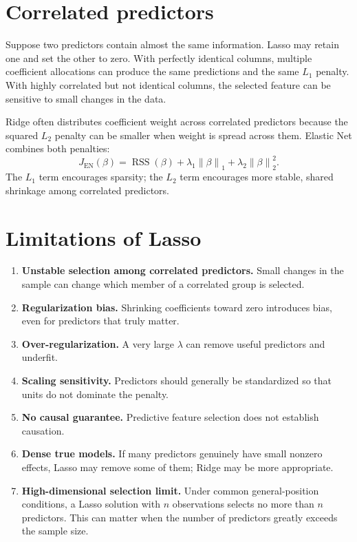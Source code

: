 \documentclass[11pt,a4paper,oneside]{book}
\newcommand{\norm}[1]{\left\lVert #1\right\rVert}
\newcommand{\RSS}{\operatorname{RSS}}
\begin{document}
\section{Correlated predictors}
Suppose two predictors contain almost the same information. Lasso may retain one and set the other to zero. With perfectly identical columns, multiple coefficient allocations can produce the same predictions and the same $L_1$ penalty. With highly correlated but not identical columns, the selected feature can be sensitive to small changes in the data.

Ridge often distributes coefficient weight across correlated predictors because the squared $L_2$ penalty can be smaller when weight is spread across them. Elastic Net combines both penalties:
\begin{equation}
  J_{\mathrm{EN}}(\beta)=\RSS(\beta)+\lambda_1\norm{\beta}_1+\lambda_2\norm{\beta}_2^2.
\end{equation}
The $L_1$ term encourages sparsity; the $L_2$ term encourages more stable, shared shrinkage among correlated predictors.

\section{Limitations of Lasso}
\begin{enumerate}
  \item \textbf{Unstable selection among correlated predictors.} Small changes in the sample can change which member of a correlated group is selected.
  \item \textbf{Regularization bias.} Shrinking coefficients toward zero introduces bias, even for predictors that truly matter.
  \item \textbf{Over-regularization.} A very large $\lambda$ can remove useful predictors and underfit.
  \item \textbf{Scaling sensitivity.} Predictors should generally be standardized so that units do not dominate the penalty.
  \item \textbf{No causal guarantee.} Predictive feature selection does not establish causation.
  \item \textbf{Dense true models.} If many predictors genuinely have small nonzero effects, Lasso may remove some of them; Ridge may be more appropriate.
  \item \textbf{High-dimensional selection limit.} Under common general-position conditions, a Lasso solution with $n$ observations selects no more than $n$ predictors. This can matter when the number of predictors greatly exceeds the sample size.
\end{enumerate}
\end{document}
